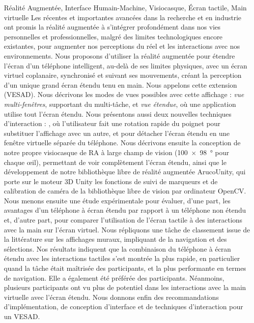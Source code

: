 \begin{sommaire}{Réalité Augmentée, Interface Humain-Machine, Visiocasque, Écran tactile, Main virtuelle}
  Les récentes et importantes avancées dans la recherche et en industrie ont promis la réalité augmentée à s'intégrer profondément dans nos vies personnelles et professionnelles, malgré des limites technologiques encore existantes, pour augmenter nos perceptions du réel et les interactions avec nos environnements.
  Nous proposons d'utiliser la réalité augmentée pour étendre l'écran d'un téléphone intelligent, au-delà de ses limites physiques, avec un écran virtuel coplanaire, synchronisé et suivant ses mouvements, créant la perception d'un unique grand écran étendu tenu en main. Nous appelons cette extension  (VESAD).
  Nous décrivons les modes de vues possibles avec cette affichage : \emph{vue multi-fenêtres}, supportant du multi-tâche, et \emph{vue étendue}, où une application utilise tout l'écran étendu.
  Nous présentons aussi deux nouvelles techniques d'interaction : , où l'utilisateur fait une rotation rapide du poignet pour substituer l'affichage avec un autre, et  pour détacher l'écran étendu en une fenêtre virtuelle séparée du téléphone.
  Nous décrivons ensuite la conception de notre propre visiocasque de RA à large champ de vision (\SI{100x98}{\degree} pour chaque œil), permettant de voir complètement l'écran étendu, ainsi que le développement de notre bibliothèque libre de réalité augmentée ArucoUnity, qui porte sur le moteur 3D Unity les fonctions de suivi de marqueurs et de calibration de caméra de la bibliothèque libre de vision par ordinateur OpenCV.
  Nous menons ensuite une étude expérimentale pour évaluer, d'une part, les avantages d'un téléphone à écran étendu par rapport à un téléphone non étendu et, d'autre part, pour comparer l'utilisation de l'écran tactile à des interactions avec la main sur l'écran virtuel. Nous répliquons une tâche de classement issue de la littérature sur les affichages muraux, impliquant de la navigation et des sélections.
  Nos résultats indiquent que la combinaison du téléphone à écran étendu avec les interactions tactiles s'est montrée la plus rapide, en particulier quand la tâche était maîtrisée des participants, et la plus performante en termes de navigation. Elle a également été préférée des participants. Néanmoins, plusieurs participants ont vu plus de potentiel dans les interactions avec la main virtuelle avec l'écran étendu.
  Nous donnons enfin des recommandations d'implémentation, de conception d'interface et de techniques d'interaction pour un VESAD.
\end{sommaire}


